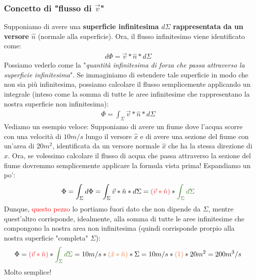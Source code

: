         \subsubsection{Concetto di "flusso di $\vec{v}$"}
            Supponiamo di avere una \textbf{superficie infinitesima $d\Sigma$ rappresentata da un versore $\hat{n}$} (normale alla superficie). Ora, il flusso infinitesimo viene identificato come:
            \begin{align*}
                d\Phi = \vec{v}*\hat{n}*d\Sigma
            \end{align*}
            Possiamo vederlo come la "\textit{quantità infinitesima di forza che passa attraverso la superficie infinitesima}". Se immaginiamo di estendere tale superficie in modo che non sia più infinitesima, possiamo calcolare il flusso semplicemente applicando un integrale (inteso come la somma di tutte le aree infinitesime che rappresentano la nostra superficie non infinitesima):
            \begin{align*}
                \Phi = \int_\Sigma\vec{v}*\hat{n}*d\Sigma
            \end{align*}
            Vediamo un esempio veloce:
            Supponiamo di avere un fiume dove l'acqua scorre con una velocità di $10m/s$ lungo il versore $\hat{x}$ e di avere una sezione del fiume con un'area di $20m^2$, identificata da un versore normale $\hat{x}$ che ha la stessa direzione di $\hat{x}$. Ora, se volessimo calcolare il flusso di acqua che passa attraverso la sezione del fiume dovremmo semplicemente applicare la formula vista prima! Espandiamo un po':
            \begin{align*}
                \Phi = \int_\Sigma d\Phi = \int_\Sigma \vec{v}*\hat{n}*d\Sigma = \textcolor{Red}{(\vec{v}*\hat{n})}*\textcolor{OliveGreen}{\int_\Sigma d\Sigma}
            \end{align*}
            Dunque, \textcolor{Red}{questo pezzo} lo portiamo fuori dato che non dipende da $\Sigma$, mentre \textcolor{OliveGreen}{quest'altro} corrisponde, idealmente, alla somma di tutte le aree infinitesime che compongono la nostra area non infinitesima (quindi corrisponde prorpio alla nostra superficie "completa" $\Sigma$):
            \begin{align*}
                \Phi = \textcolor{Red}{(\vec{v}*\hat{n})}*\textcolor{OliveGreen}{\int_\Sigma d\Sigma} = 10m/s*\textcolor{Orange}{(\hat{x}*\hat{n})}*\Sigma = 10m/s*\textcolor{Orange}{(1)}*20m^2 = 200m^3/s
            \end{align*}
            Molto semplice!
        
